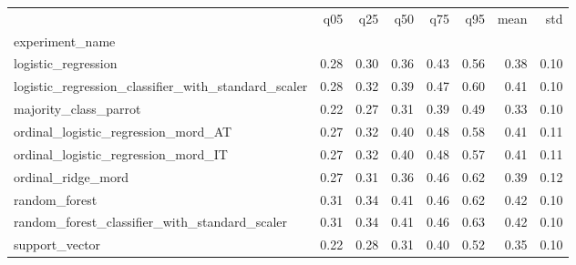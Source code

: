 \begin{tabular}{lrrrrrrr}
\toprule
 & q05 & q25 & q50 & q75 & q95 & mean & std \\
experiment_name &  &  &  &  &  &  &  \\
\midrule
logistic_regression & 0.28 & 0.30 & 0.36 & 0.43 & 0.56 & 0.38 & 0.10 \\
logistic_regression_classifier_with_standard_scaler & 0.28 & 0.32 & 0.39 & 0.47 & 0.60 & 0.41 & 0.10 \\
majority_class_parrot & 0.22 & 0.27 & 0.31 & 0.39 & 0.49 & 0.33 & 0.10 \\
ordinal_logistic_regression_mord_AT & 0.27 & 0.32 & 0.40 & 0.48 & 0.58 & 0.41 & 0.11 \\
ordinal_logistic_regression_mord_IT & 0.27 & 0.32 & 0.40 & 0.48 & 0.57 & 0.41 & 0.11 \\
ordinal_ridge_mord & 0.27 & 0.31 & 0.36 & 0.46 & 0.62 & 0.39 & 0.12 \\
random_forest & 0.31 & 0.34 & 0.41 & 0.46 & 0.62 & 0.42 & 0.10 \\
random_forest_classifier_with_standard_scaler & 0.31 & 0.34 & 0.41 & 0.46 & 0.63 & 0.42 & 0.10 \\
support_vector & 0.22 & 0.28 & 0.31 & 0.40 & 0.52 & 0.35 & 0.10 \\
\bottomrule
\end{tabular}
